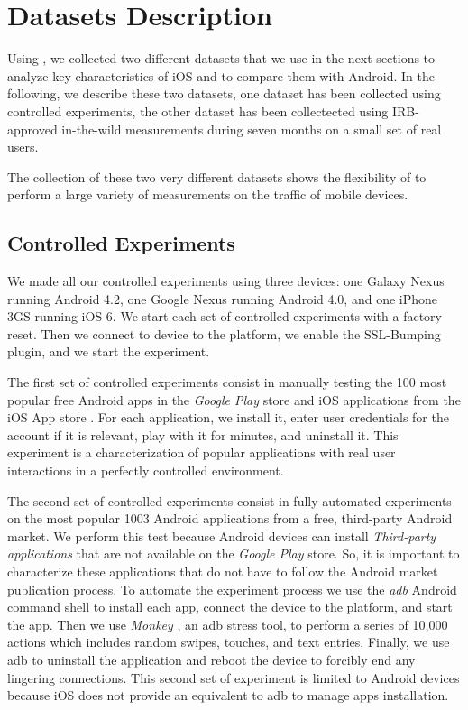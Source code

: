 \section{Datasets Description}
\label{sec:dataset}
Using \platname, we collected two different datasets that we use in the
next sections to analyze key characteristics of iOS and to compare them
with Android. In the following, we describe these two datasets, one
dataset has been collected using controlled experiments, the other
dataset has been collectected using IRB-approved in-the-wild
measurements during seven months on a small set of real users. 

The collection of these two very different datasets shows the
flexibility of \platname{} to perform a large variety of measurements
on the traffic of mobile devices. 

\subsection{Controlled Experiments}
\label{sec:dataset-contr-exper}
We made all our controlled experiments using three devices: one Galaxy
Nexus running Android 4.2, one Google Nexus running Android 4.0, and
one iPhone 3GS running iOS 6. We start each set of controlled experiments
 with a factory reset. Then we connect to device to the
\platname{} platform, we enable the SSL-Bumping plugin, and we start
the experiment. 

The first set of controlled experiments consist in manually testing the
100 most popular free Android apps in the \emph{Google Play} store and \tbd{}
iOS applications from the iOS App store . For each
application, we install it, enter user credentials for the account if
it is relevant, play with it for \tbd{} minutes, and uninstall
it. This experiment is a characterization of popular applications with
real user interactions in a perfectly controlled environment. 

The second set of controlled experiments consist in fully-automated
experiments on the most popular 1003 Android applications from a free,
third-party Android market.
We perform this test because Android devices can install
\emph{Third-party applications} that are not available on the
\emph{Google Play} store. So, it is important to characterize these
applications that do not have to follow the Android market publication
process. To
automate the experiment process we use the \emph{adb} Android command shell to
install each app, connect the device to the \platname{} platform, and
start the app. Then we use \emph{Monkey} , an adb
stress tool, to perform a series of 10,000 actions which includes
random swipes, touches, and text entries.  Finally, we use adb to
uninstall the application and reboot the device to forcibly end any
lingering connections. This second set of experiment is limited to
Android devices because iOS does not provide an equivalent to adb to
manage apps installation. 


